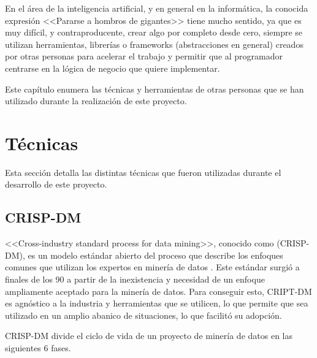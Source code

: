 \label{cha:Técnicas y herraminetas}

En el área de la inteligencia artificial, y en general en la informática, la
conocida expresión <<Pararse a hombros de gigantes>> tiene mucho sentido, ya que
es muy difícil, y contraproducente, crear algo por completo desde cero, siempre
se utilizan herramientas, librerías o frameworks (abstracciones en general)
creados por otras personas para acelerar el trabajo y permitir que al
programador centrarse en la lógica de negocio que quiere implementar.

Este capítulo enumera las técnicas y herramientas de otras personas que se han
utilizado durante la realización de este proyecto.

\section{Técnicas}

Esta sección detalla las distintas técnicas que fueron utilizadas durante el
desarrollo de este proyecto.

\subsection{CRISP-DM}

<<Cross-industry standard process for data mining>>, conocido como (CRISP-DM),
es un modelo estándar abierto del proceso que describe los enfoques comunes que
utilizan los expertos en minería de datos \cite{shearer2000crisp}. Este estándar
surgió a finales de los 90 a partir de la inexistencia y necesidad de un enfoque
ampliamente aceptado para la minería de datos. Para conseguir esto, CRIPT-DM es
agnóstico a la industria y herramientas que se utilicen, lo que permite que sea
utilizado en un amplio abanico de situaciones, lo que facilitó su adopción.

CRISP-DM divide el ciclo de vida de un proyecto de minería de datos en las
siguientes 6 fases.

